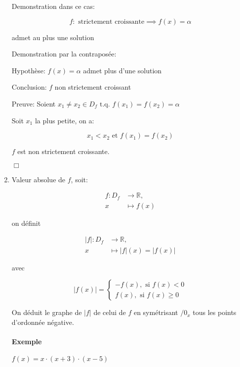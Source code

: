 \documentclass[
    11pt,
    a4paper,
    oneside,
    headinlcude, footinclude,
    twoside,
]{report}
\newcommand{\tq}[0]{\textrm{ t.q. }}
\newcommand{\cqfd}[0]{\begin{flushright}$\Box$\end{flushright}}
\begin{document}
\begin{enumerate}
Demonstration dans ce cas:

$$
f: \text{ strictement croissante} \implies f(x) = \alpha
$$

admet au plus une solution

Demonstration par la contraposée:
        
Hypothèse: $f(x) = \alpha$ admet plus d'une solution

Conclusion: $f$ non strictement croissant

Preuve: Soient $x_{1} \ne x_{2} \in D_{f} \tq f(x_{1}) = f(x_{2}) = \alpha $

Soit $x_{1}$ la plus petite, on a:

$$x_{1} < x_{2} \text{ et } f(x_{1}) = f(x_{2})$$

$f$ est non strictement croissante.
\cqfd

\item Valeur absolue de $f$, soit:

\[
\begin{split}
f: D_{f} &\to \mathbb{R},\\
x &\mapsto f(x)
\end{split}
\]

on définit

\[
\begin{split}
|f|: D_{f} &\to \mathbb{R},\\
x &\mapsto |f|(x) = |f(x)|
\end{split}
\]

avec

$$|f(x)| = \left\{\begin{array}{l} - f(x), \text{ si } f(x) < 0\\f(x),
\text{ si } f(x) \geq 0\end{array}\right.$$

On déduit le graphe de $|f|$ de celui de $f$ en symétrisant $/0_{x}$
tous les points d'ordonnée négative.


\paragraph{Exemple}
        
$f(x) = x \cdot (x+3) \cdot (x-5)$



\end{enumerate}
\end{document}
